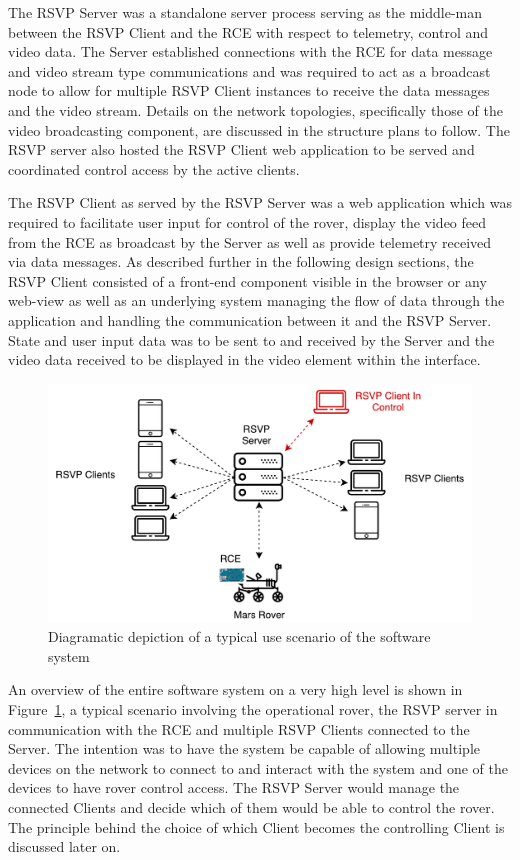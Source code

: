     The RSVP Server was a standalone server process serving as the middle-man between the RSVP Client and the RCE with respect to telemetry, control and video data. The Server established connections with the RCE for data message and video stream type communications and was required to act as a broadcast node to allow for multiple RSVP Client instances to receive the data messages and the video stream. Details on the network topologies, specifically those of the video broadcasting component, are discussed in the structure plans to follow. The RSVP server also hosted the RSVP Client web application to be served and coordinated control access by the active clients.
    
    The RSVP Client as served by the RSVP Server was a web application which was required to facilitate user input for control of the rover, display the video feed from the RCE as broadcast by the Server as well as provide telemetry received via data messages. As described further in the following design sections, the RSVP Client consisted of a front-end component visible in the browser or any web-view as well as an underlying system managing the flow of data through the application and handling the communication between it and the RSVP Server. State and user input data was to be sent to and received by the Server and the video data received to be displayed in the video element within the interface.

    \begin{figure}[h!]
      \centering
      \includegraphics[width=0.7\linewidth]{figures/softDesign-useOverview}
      \caption[Diagramatic depiction of a typical use scenario of the software system]{Diagramatic depiction of a typical use scenario of the software system}
      \label{fig:softDesign-useOverview}
    \end{figure}

    An overview of the entire software system on a very high level is shown in Figure~\ref{fig:softDesign-useOverview}, a typical scenario involving the operational rover, the RSVP server in communication with the RCE and multiple RSVP Clients connected to the Server. The intention was to have the system be capable of allowing multiple devices on the network to connect to and interact with the system and one of the devices to have rover control access. The RSVP Server would manage the connected Clients and decide which of them would be able to control the rover. The principle behind the choice of which Client becomes the controlling Client is discussed later on.
    
